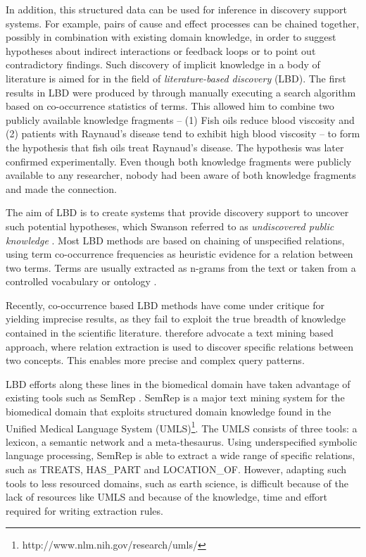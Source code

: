 \documentclass[10pt, a4paper]{article}
\begin{document}
In addition, this structured data can be used for inference in discovery support systems.
For example, pairs of cause and effect processes can be chained together, possibly in combination with existing domain knowledge, in order to suggest hypotheses about indirect interactions or feedback loops or to point out contradictory findings.
Such discovery of implicit knowledge in a body of literature is aimed for in the field of \emph{literature-based discovery} (LBD).
The first results in LBD were produced by  through manually executing a search algorithm based on co-occurrence statistics of terms. 
This allowed him to combine two publicly available knowledge fragments -- (1) Fish oils reduce blood viscosity and (2) patients with Raynaud's disease tend to exhibit high blood viscosity -- to form the hypothesis that fish oils treat Raynaud's disease.
The hypothesis was later confirmed experimentally. 
Even though both knowledge fragments were publicly available to any researcher, nobody had been aware of both knowledge fragments and made the connection.

The aim of LBD is to create systems that provide discovery support to uncover such potential hypotheses, which Swanson referred to as \emph{undiscovered public knowledge} \cite{Swanson1986Undiscovered}.
Most LBD methods are based on chaining of unspecified relations, using term co-occurrence frequencies as heuristic evidence for a relation between two terms.
Terms are usually extracted as n-grams from the text \cite{Lindsay1999LBDLexicalStat} or taken from a controlled vocabulary or ontology \cite{Weeber2001ConceptsInLBD}.

Recently, co-occurrence based LBD methods have come under critique for yielding imprecise results, as they fail to exploit the true breadth of knowledge contained in the scientific literature.
 therefore advocate a text mining based approach, where relation extraction is used to discover specific relations between two concepts.
This enables more precise and complex query patterns.

LBD efforts along these lines in the biomedical domain have taken advantage of existing tools such as SemRep \cite{Rindflesh2003SemRep}.
SemRep is a major text mining system for the biomedical domain that exploits structured domain knowledge found in the Unified Medical Language System (UMLS)\footnote{http://www.nlm.nih.gov/research/umls/}.
The UMLS consists of three tools: a lexicon, a semantic network and a meta-thesaurus. 
Using underspecified symbolic language processing, SemRep is able to extract a wide range of specific relations, such as TREATS, HAS\_PART and LOCATION\_OF.
However, adapting such tools to less resourced domains, such as earth science, is difficult because of the lack of resources like UMLS and because of the knowledge, time and effort required for writing extraction rules.
\end{document}
